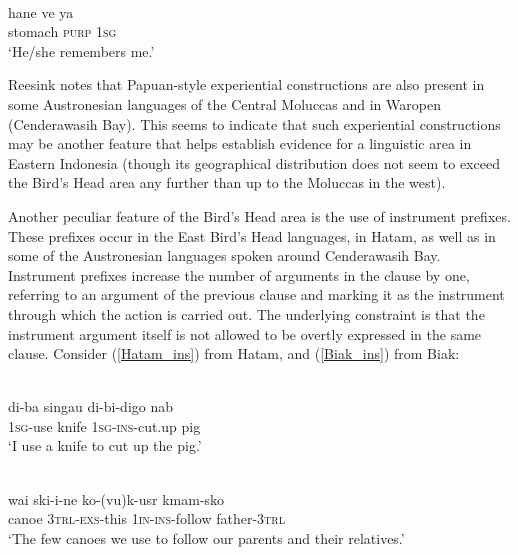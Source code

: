 \ea \label{wooi_hane}
\\
\gll hane ve ya \\
stomach \textsc{purp} \textsc{1}\textsc{sg} \\
\glft `He/she remembers me.'\\ 
\z

Reesink notes that Papuan-style experiential constructions are also present in some Austronesian languages of the Central Moluccas and in Waropen (Cenderawasih Bay). This seems to indicate that such experiential constructions may be another feature that helps establish evidence for a linguistic area in Eastern Indonesia (though its geographical distribution does not seem to exceed the Bird's Head area any further than up to the Moluccas in the west).

Another peculiar feature of the Bird's Head area is the use of instrument prefixes. These prefixes occur in the East Bird's Head languages, in Hatam, as well as in some of the Austronesian languages spoken around Cenderawasih Bay. Instrument prefixes increase the number of arguments in the clause by one, referring to an argument of the previous clause and marking it as the instrument through which the action is carried out. The underlying constraint is that the instrument argument itself is not allowed to be overtly expressed in the same clause. Consider (\ref{Hatam_ins}) from Hatam, and (\ref{Biak_ins}) from Biak:

\ea \label{Hatam_ins}
\\
\gll di-ba singau di-bi-digo nab \\
\textsc{1}\textsc{sg}-use knife \textsc{1}\textsc{sg}-\textsc{ins}-cut.up pig \\
\glft `I use a knife to cut up the pig.'\\ 
\z

\ea \label{Biak_ins}
\\
\gll wai ski-i-ne ko-(vu)k-usr kmam-sko \\
canoe \textsc{3}\textsc{trl}-\textsc{exs}-this \textsc{1}\textsc{in}-\textsc{ins}-follow father-\textsc{3}\textsc{trl} \\
\glft `The few canoes we use to follow our parents and their relatives.'\\ 
\z

